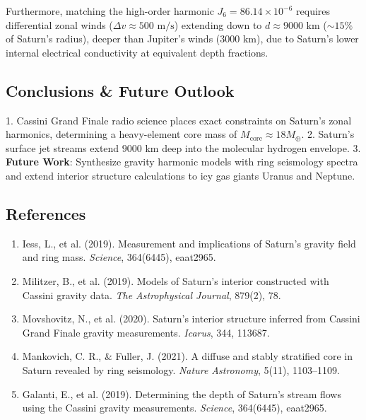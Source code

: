 \documentclass[11pt,a4paper]{article}
\begin{document}
Furthermore, matching the high-order harmonic $J_6 = 86.14 \times 10^{-6}$ requires differential zonal winds ($\Delta v \approx 500\text{ m/s}$) extending down to $d \approx 9000\text{ km}$ ($\sim 15\%$ of Saturn's radius), deeper than Jupiter's winds ($3000\text{ km}$), due to Saturn's lower internal electrical conductivity at equivalent depth fractions.

\subsection{Conclusions \& Future Outlook}
1. Cassini Grand Finale radio science places exact constraints on Saturn's zonal harmonics, determining a heavy-element core mass of $M_{\text{core}} \approx 18 M_{\oplus}$.
2. Saturn's surface jet streams extend $9000\text{ km}$ deep into the molecular hydrogen envelope.
3. \textbf{Future Work}: Synthesize gravity harmonic models with ring seismology spectra and extend interior structure calculations to icy gas giants Uranus and Neptune.

\subsection*{References}
\begin{enumerate}
    \item Iess, L., et al. (2019). Measurement and implications of Saturn's gravity field and ring mass. \textit{Science}, 364(6445), eaat2965.
    \item Militzer, B., et al. (2019). Models of Saturn's interior constructed with Cassini gravity data. \textit{The Astrophysical Journal}, 879(2), 78.
    \item Movshovitz, N., et al. (2020). Saturn's interior structure inferred from Cassini Grand Finale gravity measurements. \textit{Icarus}, 344, 113687.
    \item Mankovich, C. R., \& Fuller, J. (2021). A diffuse and stably stratified core in Saturn revealed by ring seismology. \textit{Nature Astronomy}, 5(11), 1103--1109.
    \item Galanti, E., et al. (2019). Determining the depth of Saturn's stream flows using the Cassini gravity measurements. \textit{Science}, 364(6445), eaat2965.
\end{enumerate}

\newpage

\end{document}
